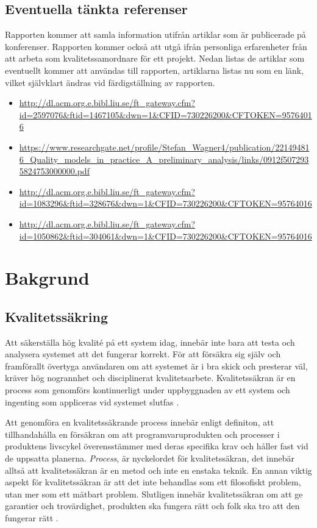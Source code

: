 \clearpage

\subsection{Eventuella tänkta referenser}

Rapporten kommer att samla information utifrån artiklar som är publicerade på konferenser. Rapporten kommer också att utgå ifrån personliga erfarenheter från att arbeta som kvalitetssamordnare för ett projekt. Nedan listas de artiklar som eventuellt kommer att användas till rapporten, artiklarna listas nu som en länk, vilket självklart ändras vid färdigställning av rapporten.

\begin{itemize}
	\item \url{http://dl.acm.org.e.bibl.liu.se/ft_gateway.cfm?id=2597076&ftid=1467105&dwn=1&CFID=730226200&CFTOKEN=95764016}
	\item \url{https://www.researchgate.net/profile/Stefan_Wagner4/publication/221494816_Quality_models_in_practice_A_preliminary_analysis/links/0912f5072935824753000000.pdf}
	\item \url{http://dl.acm.org.e.bibl.liu.se/ft_gateway.cfm?id=1083296&ftid=328676&dwn=1&CFID=730226200&CFTOKEN=95764016}
	\item \url{http://dl.acm.org.e.bibl.liu.se/ft_gateway.cfm?id=1050862&ftid=304061&dwn=1&CFID=730226200&CFTOKEN=95764016}
\end{itemize}

\section{Bakgrund}
\label{sec:background-wallstrom}
\subsection{Kvalitetssäkring}
Att säkerställa hög kvalité på ett system idag, innebär inte bara att testa och analysera systemet att det fungerar korrekt. För att försäkra sig själv och framförallt övertyga användaren om att systemet är i bra skick och presterar väl, kräver hög nogrannhet och disciplinerat kvalitetsarbete. Kvalitetssäkran är en process som genomförs kontinuerligt under uppbyggnaden av ett system och ingenting som appliceras vid systemet slutfas \cite{feldman2005quality}.

Att genomföra en kvalitetssäkrande process innebär enligt definiton, att tillhandahålla en försäkran om att programvaruprodukten och processer i produktens livscykel överensstämmer med deras specifika krav och håller fast vid de uppsatta planerna. \textit{Process}, är nyckelordet för kvalitetssäkran, det innebär alltså att kvalitetssäkran är en metod och inte en enstaka teknik. En annan viktig aspekt för kvalitetssäkran är att det inte behandlas som ett filosofiskt problem, utan mer som ett mätbart problem. Slutligen innebär kvalitetssäkran om att ge garantier och trovärdighet, produkten ska fungera rätt och folk ska tro att den fungerar rätt \cite{feldman2005quality}.

